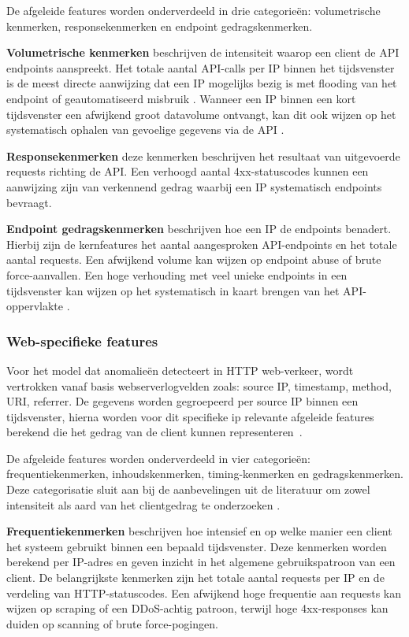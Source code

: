 De afgeleide features worden onderverdeeld in drie categorieën: volumetrische kenmerken, responsekenmerken en endpoint gedragskenmerken. 

\textbf{Volumetrische kenmerken} beschrijven de intensiteit waarop een client de API endpoints aanspreekt. Het totale aantal API-calls per IP binnen het tijdsvenster is de meest directe aanwijzing dat een IP mogelijks bezig is met flooding van het endpoint of geautomatiseerd misbruik \autocite{Sowmya2023}. Wanneer een IP binnen een kort tijdsvenster een afwijkend groot datavolume ontvangt, kan dit ook wijzen op het systematisch ophalen van gevoelige gegevens via de API \autocite{Sowmya2023, OWASP2023}.

\textbf{Responsekenmerken} deze kenmerken beschrijven het resultaat van uitgevoerde requests richting de API. Een verhoogd aantal 4xx-statuscodes kunnen een aanwijzing zijn van verkennend gedrag waarbij een IP systematisch endpoints bevraagt\autocite{OWASP2023}.

\textbf{Endpoint gedragskenmerken} beschrijven hoe een IP de endpoints benadert. Hierbij zijn de kernfeatures het aantal aangesproken API-endpoints en het totale aantal requests. Een afwijkend volume kan wijzen op endpoint abuse of brute force-aanvallen\autocite{Sowmya2023}. Een hoge verhouding met veel unieke endpoints in een tijdsvenster kan wijzen op het systematisch in kaart brengen van het API-oppervlakte \autocite{OWASP2023}.

\subsubsection{Web-specifieke features}
Voor het model dat anomalieën detecteert in HTTP web-verkeer, wordt vertrokken vanaf basis webserverlogvelden zoals: source IP, timestamp, method, URI, referrer. De gegevens worden gegroepeerd per source IP binnen een tijdsvenster, hierna worden voor dit specifieke ip relevante afgeleide features berekend die het gedrag van de client kunnen representeren~\autocite{Chua2024}. 

De afgeleide features worden onderverdeeld in vier categorieën: frequentiekenmerken, inhoudskenmerken, timing-kenmerken en gedragskenmerken. Deze categorisatie sluit aan bij de aanbevelingen uit de literatuur om zowel intensiteit als aard van het clientgedrag te onderzoeken \autocite{Chua2024, Schummer2024}.

\textbf{Frequentiekenmerken} beschrijven hoe intensief en op welke manier een client het systeem gebruikt binnen een bepaald tijdsvenster. Deze kenmerken worden berekend per IP-adres en geven inzicht in het algemene gebruikspatroon van een client.
De belangrijkste kenmerken zijn het totale aantal requests per IP en de verdeling van HTTP-statuscodes. Een afwijkend hoge frequentie aan requests kan wijzen op scraping of een DDoS-achtig patroon, terwijl hoge 4xx-responses kan duiden op scanning of brute force-pogingen\autocite{Chua2024, OWASP2023}.

